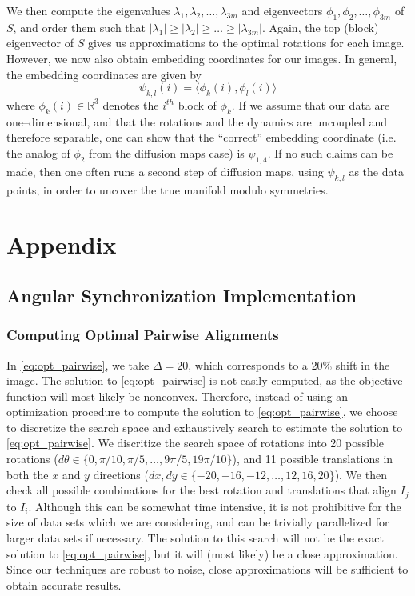 \documentclass[11pt]{article}
\begin{document}
We then compute the eigenvalues $\lambda_1, \lambda_2, \dots, \lambda_{3m}$ and eigenvectors $\phi_1, \phi_2, \dots, \phi_{3m}$ of $S$, and order them such that $|\lambda_1| \ge |\lambda_2| \ge \dots \ge |\lambda_{3m}|$.
%
Again, the top (block) eigenvector of $S$ gives us approximations to the optimal rotations for each image.
%
However, we now also obtain embedding coordinates for our images.
%
In general, the embedding coordinates are given by 
\begin{equation}
\psi_{k,l} (i) = \langle \phi_k(i), \phi_l(i) \rangle
\end{equation}
where $\phi_k(i) \in \mathbb{R}^3$ denotes the $i^{th}$ block of $\phi_k$.
%
If we assume that our data are one--dimensional, and that the rotations and the dynamics are uncoupled and therefore separable, one can show that the ``correct'' embedding coordinate (i.e. the analog of $\phi_2$ from the diffusion maps case) is $\psi_{1,4}$.
%
If no such claims can be made, then one often runs a second step of diffusion maps, using $\psi_{k,l}$ as the data points, in order to uncover the true manifold modulo symmetries. 


\section{Appendix}

\subsection{Angular Synchronization Implementation}

\subsubsection{Computing Optimal Pairwise Alignments}

In \eqref{eq:opt_pairwise}, we take $\Delta=20$, which corresponds to a 20\% shift in the image. 
%
The solution to \eqref{eq:opt_pairwise} is not easily computed, as the objective function will most likely be nonconvex.
%
Therefore, instead of using an optimization procedure to compute the solution to \eqref{eq:opt_pairwise}, we choose to discretize the search space and exhaustively search to estimate the solution to \eqref{eq:opt_pairwise}.
%
We discritize the search space of rotations into 20 possible rotations ($d\theta  \in \{0, \pi/10, \pi/5, \dots, 9 \pi/5, 19\pi/10 \}$), and 11 possible translations in both the $x$ and $y$ directions ($dx, dy \in \{-20, -16, -12, \dots, 12, 16, 20 \}$). 
%
We then check all possible combinations for the best rotation and translations that align $I_j$ to $I_i$. 
%
Although this can be somewhat time intensive, it is not prohibitive for the size of data sets which we are considering, and can be trivially parallelized for larger data sets if necessary.
%
The solution to this search will not be the exact solution to \eqref{eq:opt_pairwise}, but it will (most likely) be a close approximation.
%
Since our techniques are robust to noise, close approximations will be sufficient to obtain accurate results.
\end{document}
